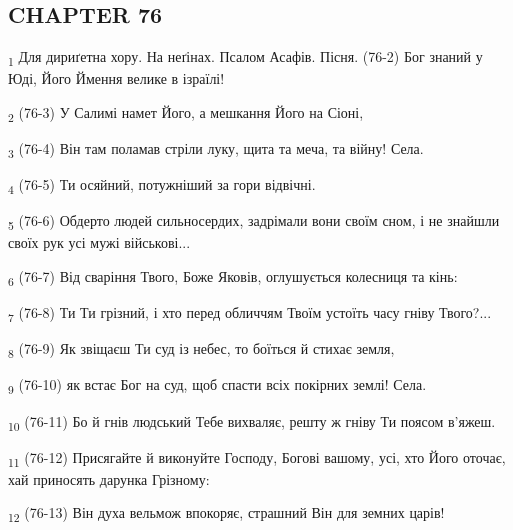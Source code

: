 \subsection{CHAPTER 76}
\begin{tcolorbox}
\textsubscript{1} Для дириґетна хору. На неґінах. Псалом Асафів. Пісня. (76-2) Бог знаний у Юді, Його Ймення велике в ізраїлі!
\end{tcolorbox}
\begin{tcolorbox}
\textsubscript{2} (76-3) У Салимі намет Його, а мешкання Його на Сіоні,
\end{tcolorbox}
\begin{tcolorbox}
\textsubscript{3} (76-4) Він там поламав стріли луку, щита та меча, та війну! Села.
\end{tcolorbox}
\begin{tcolorbox}
\textsubscript{4} (76-5) Ти осяйний, потужніший за гори відвічні.
\end{tcolorbox}
\begin{tcolorbox}
\textsubscript{5} (76-6) Обдерто людей сильносердих, задрімали вони своїм сном, і не знайшли своїх рук усі мужі військові...
\end{tcolorbox}
\begin{tcolorbox}
\textsubscript{6} (76-7) Від сваріння Твого, Боже Яковів, оглушується колесниця та кінь:
\end{tcolorbox}
\begin{tcolorbox}
\textsubscript{7} (76-8) Ти Ти грізний, і хто перед обличчям Твоїм устоїть часу гніву Твого?...
\end{tcolorbox}
\begin{tcolorbox}
\textsubscript{8} (76-9) Як звіщаєш Ти суд із небес, то боїться й стихає земля,
\end{tcolorbox}
\begin{tcolorbox}
\textsubscript{9} (76-10) як встає Бог на суд, щоб спасти всіх покірних землі! Села.
\end{tcolorbox}
\begin{tcolorbox}
\textsubscript{10} (76-11) Бо й гнів людський Тебе вихваляє, решту ж гніву Ти поясом в'яжеш.
\end{tcolorbox}
\begin{tcolorbox}
\textsubscript{11} (76-12) Присягайте й виконуйте Господу, Богові вашому, усі, хто Його оточає, хай приносять дарунка Грізному:
\end{tcolorbox}
\begin{tcolorbox}
\textsubscript{12} (76-13) Він духа вельмож впокоряє, страшний Він для земних царів!
\end{tcolorbox}
